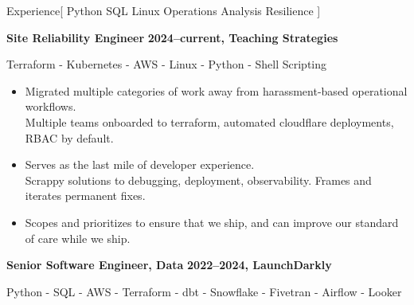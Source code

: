\documentclass[11pt,a4paper]{article}
\begin{document}
\sloppy  %


\vspace{1em}

\begin{mysection}{Experience}[
    Python
    \textbullet{} SQL
    \textbullet{} Linux
    \textbullet{} Operations
    \textbullet{} Analysis
    \textbullet{} Resilience
]

  \begin{addmargin}[0.5em]{0em}
    {\large\bfseries Site Reliability Engineer}%
    \hfill {\bfseries 2024--current, Teaching Strategies}
    \begin{adjustwidth}{1ex}{0ex}
    Terraform - Kubernetes - AWS - Linux - Python - Shell Scripting


    \begin{itemize}
        [label=-, topsep=0pt, itemsep=0.5ex, parsep=0pt, leftmargin=1em]

    \item Migrated multiple categories of work away from harassment-based operational workflows.
    \\    Multiple teams onboarded to terraform, automated cloudflare deployments, RBAC by default.
    \item Serves as the last mile of developer experience.
    \\    Scrappy solutions to debugging, deployment, observability.
          Frames and iterates permanent fixes.
    \item Scopes and prioritizes to ensure that we ship, and can improve our standard of care while we ship.

    \end{itemize}

  \end{adjustwidth}
\end{addmargin}
\medskip

  \begin{addmargin}[0.5em]{0em}
    {\large\bfseries Senior Software Engineer, Data}%
    \hfill {\bfseries 2022--2024, LaunchDarkly}%
    \begin{adjustwidth}{1ex}{0ex}
      Python - SQL - AWS - Terraform - dbt - Snowflake - Fivetran - Airflow
      - Looker


\end{adjustwidth}
\end{addmargin}
\end{mysection}
\end{document}
